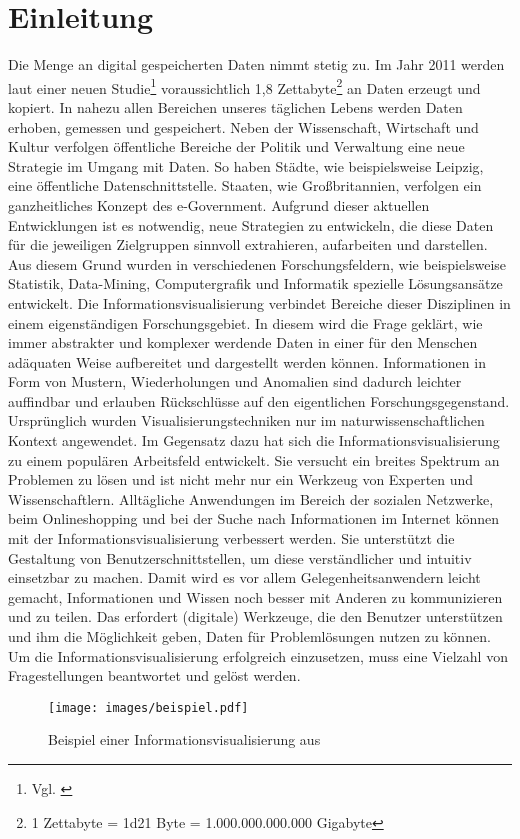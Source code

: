 \documentclass[a4paper, 
               12pt,
               DIV=calc,
               version=first,
               pdftex,
               headsepline,
               footsepline,
               bibtotocnumbered,
               liststotocnumbered]{scrreprt}
\begin{document}
\chapter{Einleitung}
\label{cha:Einleitung}
Die Menge an digital gespeicherten Daten nimmt stetig zu. Im Jahr 2011 werden laut einer neuen
Studie\footnote{Vgl. \citep{EMC}} voraussichtlich 1,8 Zettabyte\footnote{1 Zettabyte = \num{1d21}
Byte = 1.000.000.000.000 Gigabyte} an Daten erzeugt und kopiert. In nahezu allen Bereichen unseres
täglichen Lebens werden Daten erhoben, gemessen und gespeichert. Neben der Wissenschaft, Wirtschaft
und Kultur verfolgen öffentliche Bereiche der Politik und Verwaltung eine neue Strategie im Umgang
mit Daten. So haben Städte, wie beispielsweise Leipzig, eine öffentliche Datenschnittstelle.
Staaten, wie Großbritannien, verfolgen ein ganzheitliches Konzept des e-Government. Aufgrund dieser
aktuellen Entwicklungen ist es notwendig, neue Strategien zu entwickeln, die diese Daten
für die jeweiligen Zielgruppen sinnvoll extrahieren, aufarbeiten und darstellen. Aus diesem
Grund wurden in verschiedenen Forschungsfeldern, wie beispielsweise Statistik, Data-Mining,
Computergrafik und Informatik spezielle Lösungsansätze entwickelt.
Die Informationsvisualisierung verbindet Bereiche dieser Disziplinen in einem eigenständigen
Forschungsgebiet.
In diesem wird die Frage geklärt, wie immer abstrakter und komplexer werdende Daten
in einer für den Menschen adäquaten Weise aufbereitet und dargestellt werden können. 
Informationen in Form von Mustern, Wiederholungen und Anomalien sind dadurch leichter auffindbar und erlauben
Rückschlüsse auf den eigentlichen Forschungsgegenstand. Ursprünglich wurden Visualisierungstechniken nur im
naturwissenschaftlichen Kontext angewendet.
Im Gegensatz dazu hat sich die Informationsvisualisierung zu einem populären Arbeitsfeld entwickelt. Sie versucht ein breites
Spektrum an Problemen zu lösen und ist nicht mehr nur ein Werkzeug von Experten und Wissenschaftlern.
Alltägliche Anwendungen
im Bereich der sozialen Netzwerke, beim Onlineshopping und bei der Suche nach Informationen
im Internet können mit der Informationsvisualisierung verbessert
werden. Sie unterstützt die Gestaltung von Benutzerschnittstellen, um diese verständlicher und intuitiv einsetzbar zu machen.
Damit wird es vor allem Gelegenheitsanwendern leicht gemacht, Informationen und
Wissen noch besser mit Anderen zu kommunizieren und zu teilen. Das erfordert (digitale) Werkzeuge,
die den Benutzer unterstützen und ihm die Möglichkeit geben, Daten für Problemlösungen nutzen zu können.
Um die Informationsvisualisierung erfolgreich einzusetzen, muss eine Vielzahl von Fragestellungen
beantwortet und gelöst werden.
\begin{figure}
\centering
\texttt{[image: images/beispiel.pdf]}
\caption{Beispiel einer Informationsvisualisierung aus \citep[S.\,76]{McCandless}}
\label{fig:beispiel}
\end{figure}
\end{document}
